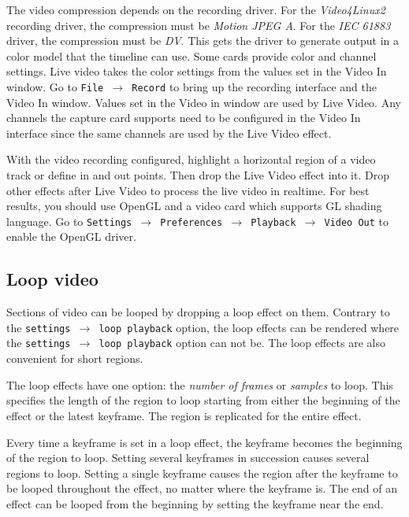 The video compression depends on the recording driver. For the \textit{Video4Linux2} recording driver, the compression must be \textit{Motion JPEG A}. For the \textit{IEC 61883} driver, the compression must be \textit{DV}. This gets the driver to generate output in a color model that the timeline can use. Some cards provide color and channel settings. Live video takes the color settings from the values set in the Video In window. Go to \texttt{File $\rightarrow$ Record} to bring up the recording interface and the Video In window. Values set in the Video in window are used by Live Video. Any channels the capture card supports need to be configured in the Video In interface since the same channels are used by the Live Video effect.

With the video recording configured, highlight a horizontal region of a video track or define in and out points. Then drop the Live Video effect into it. Drop other effects after Live Video to process the live video in realtime. For best results, you should use OpenGL and a video card which supports GL shading language. Go to \texttt{Settings $\rightarrow$ Preferences $\rightarrow$ Playback $\rightarrow$ Video Out} to enable the OpenGL driver.

\subsection{Loop video}%
\label{sub:loop_video}

Sections of video can be looped by dropping a loop effect on them. Contrary to the \texttt{settings $\rightarrow$ loop playback} option, the loop effects can be rendered where the \texttt{settings $\rightarrow$ loop playback} option can not be. The loop effects are also convenient for short regions.

The loop effects have one option: the \textit{number of frames} or \textit{samples} to loop. This specifies the length of the region to loop starting from either the beginning of the effect or the latest keyframe. The region is replicated for the entire effect.

Every time a keyframe is set in a loop effect, the keyframe becomes the beginning of the region to loop. Setting several keyframes in succession causes several regions to loop. Setting a single keyframe causes the region after the keyframe to be looped throughout the effect, no matter where the keyframe is. The end of an effect can be looped from the beginning by setting the keyframe near the end.

